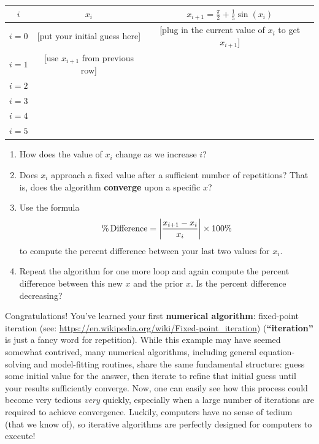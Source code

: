 \documentclass[11pt]{article}
\begin{document}
\vspace{10 pt}
\begin{tabular}{c|c|c}
		$i$ & $x_i$ & $x_{i+1} = \frac{\pi}{2} + \frac{1}{5}\sin(x_i)$ \\
\hline
\hline
$i = 0$ & [put your initial guess here] & [plug in the current value of $x_i$ to get $x_{i+1}$]\\
\hline
$i = 1$ & [use $x_{i+1}$ from previous row] & \\
\hline
$i = 2$ & & \\
\hline
$i = 3$ & & \\
\hline
$i = 4$ & & \\
\hline
$i = 5$ & & \\
\end{tabular}

\medskip
\begin{enumerate}[resume]
    \item How does the value of $x_i$ change as we increase $i$? 
    
    \item Does $x_i$ approach a fixed value after a sufficient number of repetitions? That is, does the algorithm \textbf{converge} upon a specific $x$?
    
    \item Use the formula 
    \begin{equation} \label{eq:percent}
        \% \, {\rm Difference} = \left| \frac{x_{i+1} - x_i}{x_i} \right| \times 100\%
    \end{equation}
    to compute the percent difference between your last two values for $x_i$.
    
    \item Repeat the algorithm for one more loop and again compute the percent difference between this new $x$ and the prior $x$. Is the percent difference decreasing?
\end{enumerate}

\noindent
Congratulations! You've learned your first \textbf{numerical algorithm}: fixed-point iteration (see: \url{https://en.wikipedia.org/wiki/Fixed-point_iteration}) (\textbf{``iteration''} is just a fancy word for repetition). While this example may have seemed somewhat contrived, many numerical algorithms, including general equation-solving and model-fitting routines, share the same fundamental structure: guess some initial value for the answer, then iterate to refine that initial guess until your results sufficiently converge. Now, one can easily see how this process could become very tedious \textit{very} quickly, especially when a large number of iterations are required to achieve convergence. Luckily, computers have no sense of tedium (that we know of), so iterative algorithms are perfectly designed for computers to execute! 
\end{document}

